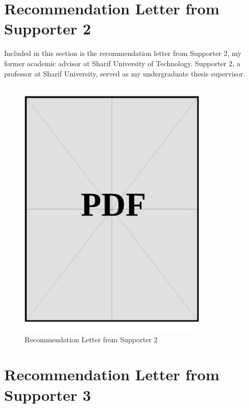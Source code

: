 \clearpage

\section{Recommendation Letter from Supporter 2}\label{sec:recommendation-letter-2}

Included in this section is the recommendation letter from Supporter 2, my former academic advisor at Sharif University of Technology. Supporter 2, a professor at Sharif University, served as my undergraduate thesis supervisor.

\begin{figure}[H]
    \centering
    \includegraphics[page=1, width=0.8\textwidth]{../docs/applicant/recommendation-letters/letter-2.pdf}
    \caption{Recommendation Letter from Supporter 2}
    \label{fig:recommendation-letter-2}
\end{figure}

\clearpage

\section{Recommendation Letter from Supporter 3}\label{sec:recommendation-letter-3}


